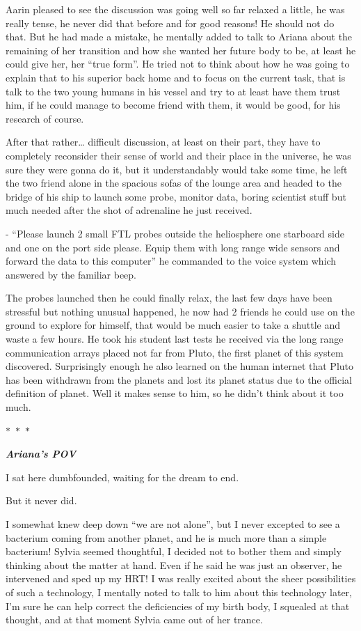\documentclass[hidelinks,12pt,a4paper]{book}
\newcommand\sep{\begin{center}
  \boldmath $\ast$~$\ast$~$\ast$
\end{center}}
\begin{document}
Aarin pleased to see the discussion was going well so far relaxed a little, he was really tense, 
he never did that before and for good reasons! He should not do that. But he had made a mistake, 
he mentally added to talk to Ariana about the remaining of her transition and how she wanted her future body to be, 
at least he could give her, her  “true form”. He tried not to think about how he was going to explain that to his superior 
back home and to focus on the current task, that is talk to the two young humans in his vessel and try to at least have 
them trust him, if he could manage to become friend with them, it would be good, for his research of course.\par
\bigskip
After that rather… difficult discussion, at least on their part, they have to completely reconsider their 
sense of world and their place in the universe, he was sure they were gonna do it, but it understandably would
 take some time, he left the two friend alone in the spacious sofas of the lounge area and headed to the bridge of 
 his ship to launch some probe, monitor data, boring scientist stuff but much needed after the shot of adrenaline he 
 just received.\par
 \bigskip

- “Please launch 2 small FTL probes outside the heliosphere one starboard side and one on the port side please. 
Equip them with long range wide sensors and forward the data to this computer” he commanded to the voice system 
which answered by the familiar beep.\par
\bigskip

The probes launched then he could finally relax, the last few days have been stressful but nothing unusual happened,
 he now had 2 friends he could use on the ground to explore for himself, that would be much easier to take a 
 shuttle and waste a few hours. He took his student last tests he received via the long range communication arrays
  placed not far from Pluto, the first planet of this system discovered. Surprisingly enough he also learned on 
  the human internet that Pluto has been withdrawn from the planets and lost its planet status due to
   the official definition of planet. Well it makes sense to him, so he didn't think about it too much.

\sep 

\textit{\textbf{Ariana's POV}}\par
\bigskip
I sat here dumbfounded, waiting for the dream to end.\par
\bigskip
But it never did.\par
\bigskip
I somewhat knew deep down “we are not alone”, but I never excepted to see a bacterium coming from another planet, and he is much more than a simple bacterium!
Sylvia seemed thoughtful, I decided not to bother them and simply thinking about the matter at hand. 
Even if he said he was just an observer, he intervened and sped up my HRT! I was really excited about the sheer possibilities 
of such a technology, I mentally noted to talk to him about this technology later, I'm sure he can help correct 
the deficiencies of my birth body, I squealed at that thought, and at that moment Sylvia came out of her trance.\par
\bigskip
\end{document}
